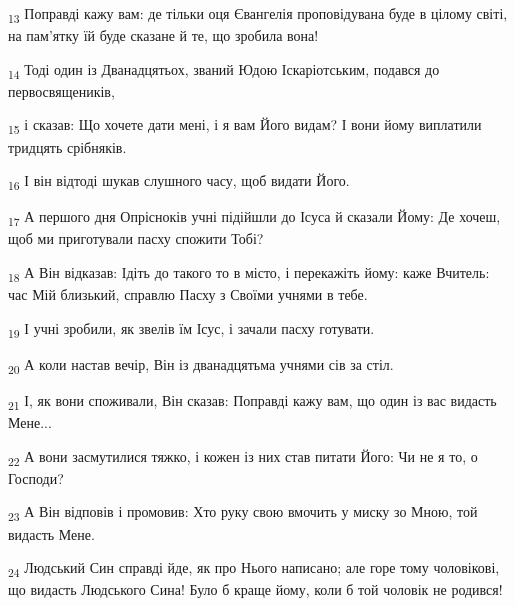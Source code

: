 \begin{tcolorbox}
\textsubscript{13} Поправді кажу вам: де тільки оця Євангелія проповідувана буде в цілому світі, на пам'ятку їй буде сказане й те, що зробила вона!
\end{tcolorbox}
\begin{tcolorbox}
\textsubscript{14} Тоді один із Дванадцятьох, званий Юдою Іскаріотським, подався до первосвящеників,
\end{tcolorbox}
\begin{tcolorbox}
\textsubscript{15} і сказав: Що хочете дати мені, і я вам Його видам? І вони йому виплатили тридцять срібняків.
\end{tcolorbox}
\begin{tcolorbox}
\textsubscript{16} І він відтоді шукав слушного часу, щоб видати Його.
\end{tcolorbox}
\begin{tcolorbox}
\textsubscript{17} А першого дня Опрісноків учні підійшли до Ісуса й сказали Йому: Де хочеш, щоб ми приготували пасху спожити Тобі?
\end{tcolorbox}
\begin{tcolorbox}
\textsubscript{18} А Він відказав: Ідіть до такого то в місто, і перекажіть йому: каже Вчитель: час Мій близький, справлю Пасху з Своїми учнями в тебе.
\end{tcolorbox}
\begin{tcolorbox}
\textsubscript{19} І учні зробили, як звелів їм Ісус, і зачали пасху готувати.
\end{tcolorbox}
\begin{tcolorbox}
\textsubscript{20} А коли настав вечір, Він із дванадцятьма учнями сів за стіл.
\end{tcolorbox}
\begin{tcolorbox}
\textsubscript{21} І, як вони споживали, Він сказав: Поправді кажу вам, що один із вас видасть Мене...
\end{tcolorbox}
\begin{tcolorbox}
\textsubscript{22} А вони засмутилися тяжко, і кожен із них став питати Його: Чи не я то, о Господи?
\end{tcolorbox}
\begin{tcolorbox}
\textsubscript{23} А Він відповів і промовив: Хто руку свою вмочить у миску зо Мною, той видасть Мене.
\end{tcolorbox}
\begin{tcolorbox}
\textsubscript{24} Людський Син справді йде, як про Нього написано; але горе тому чоловікові, що видасть Людського Сина! Було б краще йому, коли б той чоловік не родився!
\end{tcolorbox}
